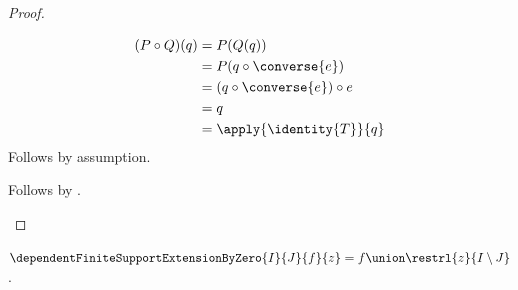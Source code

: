 \begin{proof}
\begin{subproof}
\begin{subproof}
\begin{align*}
                (P\circ Q)(q)
                    &= P(Q(q))
                    \\
                    &= P(q\circ\converse{e})
                    \\
                    &= (q\circ\converse{e})\circ e
                    \\
                    &= q
                    \\
                    &= \apply{\identity{T}}{q}
            \end{align*}
            Follows by assumption.
        \end{subproof}
        Follows by .
    \end{subproof}
\end{proof}

\begin{definition}\label{dependent_finite_support_extension_by_zero}
    $\dependentFiniteSupportExtensionByZero{I}{J}{f}{z}
        =f\union\restrl{z}{I\setminus J}$.
\end{definition}

